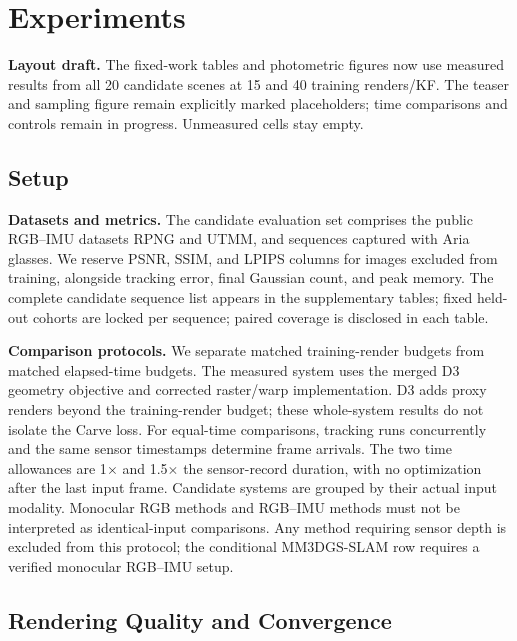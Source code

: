\section{Experiments}
\label{sec:exp}

\noindent\textbf{Layout draft.}
The fixed-work tables and photometric figures now use measured results from
all 20 candidate scenes at 15 and 40 training renders/KF.
The teaser and sampling figure remain explicitly marked placeholders;
time comparisons and controls remain in progress. Unmeasured cells stay empty.

\subsection{Setup}
\label{ssec:setup}

\noindent\textbf{Datasets and metrics.}
The candidate evaluation set comprises the public RGB--IMU datasets RPNG and
UTMM, and sequences captured with Aria glasses.
We reserve PSNR, SSIM, and LPIPS columns for images excluded from training,
alongside tracking error, final Gaussian count, and peak memory.
The complete candidate sequence list appears in the supplementary tables;
fixed held-out cohorts are locked per sequence; paired coverage is disclosed in each table.

\noindent\textbf{Comparison protocols.}
We separate matched training-render budgets from matched elapsed-time budgets.
The measured system uses the merged D3 geometry objective and corrected raster/warp implementation. D3 adds proxy renders beyond the training-render budget; these whole-system results do not isolate the Carve loss.
For equal-time comparisons, tracking runs concurrently and the same sensor
timestamps determine frame arrivals. The two time allowances are
1$\times$ and 1.5$\times$ the sensor-record duration, with no optimization
after the last input frame.
Candidate systems are grouped by their actual input modality. Monocular
RGB methods and RGB--IMU methods must not be interpreted as identical-input
comparisons. Any method requiring sensor depth is excluded from this protocol;
the conditional MM3DGS-SLAM row requires a verified monocular RGB--IMU setup.

\subsection{Rendering Quality and Convergence}
\label{ssec:main}

